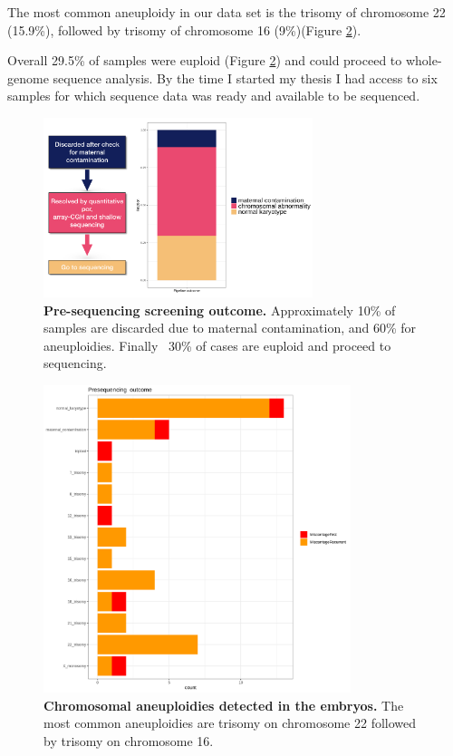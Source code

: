 The most common aneuploidy in our data set is the trisomy of chromosome 22 (15.9\%), followed by trisomy of chromosome 16 (9\%)(Figure \ref{fig:preseqOutcome}).\newline

Overall 29.5\% of samples were euploid (Figure \ref{fig:preseqOutcome}) and could proceed to whole-genome sequence analysis. By the time I started my thesis I had access to six samples for which sequence data was ready and available to be sequenced. 

\begin{figure}[H]
\centering
\includegraphics[width=0.7\textwidth]{fig/sampletocollectG.png}
\decoRule
\caption{\textbf{Pre-sequencing screening outcome.} Approximately 10\% of samples are discarded due to maternal contamination, and 60\% for aneuploidies. Finally ~30\% of cases are euploid and proceed to sequencing.}
\label{fig:pipelineOutcome}
\end{figure}

\begin{figure}[H]
\centering
\includegraphics[width=0.8\textwidth]{fig/preseqOutcome.png}
\decoRule
\caption{\textbf{Chromosomal aneuploidies detected in the embryos.} The most common aneuploidies are trisomy on chromosome 22 followed by trisomy on chromosome 16.}
\label{fig:preseqOutcome}
\end{figure}



